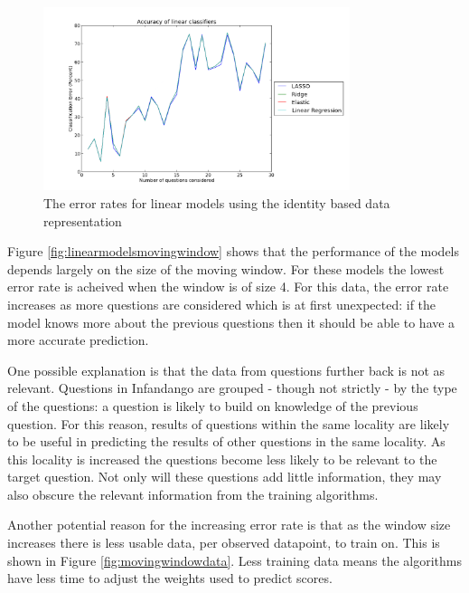 \begin{figure}[h!]
\centering
\includegraphics[width=0.8\textwidth]{images/linearmodelsidentified.png}
\caption{The error rates for linear models using the identity based data representation}
\label{fig:linearmodelsidentified}
\end{figure}

Figure \ref{fig:linearmodelsmovingwindow} shows that the performance of the models depends largely on the size of the moving window. For these models the lowest error rate is acheived when the window is of size 4. For this data, the error rate increases as more questions are considered which is at first unexpected: if the model knows more about the previous questions then it should be able to have a more accurate prediction. 

One possible explanation is that the data from questions further back is not as relevant. Questions in Infandango are grouped - though not strictly - by the type of the questions: a question is likely to build on knowledge of the previous question. For this reason, results of questions within the same locality are likely to be useful in predicting the results of other questions in the same locality. As this locality is increased the questions become less likely to be relevant to the target question. Not only will these questions add little information, they may also obscure the relevant information from the training algorithms.

Another potential reason for the increasing error rate is that as the window size increases there is less usable data, per observed datapoint, to train on. This is shown in Figure \ref{fig:movingwindowdata}. Less training data means the algorithms have less time to adjust the weights used to predict scores.

